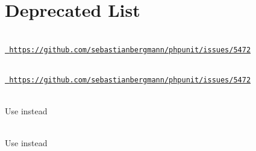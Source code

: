 \chapter{Deprecated List}
\hypertarget{deprecated}{}\label{deprecated}

\begin{DoxyRefList}
\item[Global \doxylink{class_p_h_p_unit_1_1_framework_1_1_assert_a60343b0763f808380a0d6ae669ede96e}{Assert\+::assert\+String\+Not\+Matches\+Format} (string \$format, string \$string, string \$message=\textquotesingle{}\textquotesingle{})]\hfill \\
\label{deprecated__deprecated000019}%
%
\href{https://github.com/sebastianbergmann/phpunit/issues/5472}{\texttt{ https\+://github.\+com/sebastianbergmann/phpunit/issues/5472}}  
\item[Global \doxylink{class_p_h_p_unit_1_1_framework_1_1_assert_a2d7501729a15c4a790a9020a15fe5cad}{Assert\+::assert\+String\+Not\+Matches\+Format\+File} (string \$format\+File, string \$string, string \$message=\textquotesingle{}\textquotesingle{})]\hfill \\
\label{deprecated__deprecated000020}%
%
\href{https://github.com/sebastianbergmann/phpunit/issues/5472}{\texttt{ https\+://github.\+com/sebastianbergmann/phpunit/issues/5472}}  
\item[Global \doxylink{class_php_parser_1_1_node_1_1_stmt_1_1_class___a26d81fb5e226b8583670d7ade369a2b2}{Class\+\_\+\+::MODIFIER\+\_\+\+ABSTRACT} ]\hfill \\
\label{deprecated__deprecated000009}%
%
Use  instead  
\item[Global \doxylink{class_php_parser_1_1_node_1_1_stmt_1_1_class___ab371e124fe93361d4ec6073ce04313fc}{Class\+\_\+\+::MODIFIER\+\_\+\+FINAL} ]\hfill \\
\label{deprecated__deprecated000010}%
%
Use  instead  
\item[Global \doxylink{class_php_parser_1_1_node_1_1_stmt_1_1_class___a0b850182498421713895031ef81ada8b}{Class\+\_\+\+::MODIFIER\+\_\+\+PRIVATE} ]\hfill \\
\label{deprecated__deprecated000007}%

\end{DoxyRefList}
